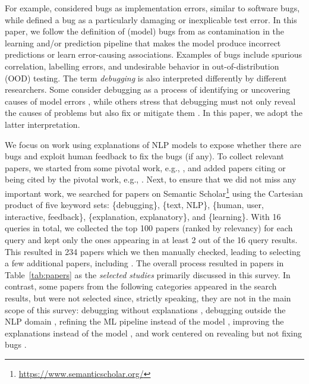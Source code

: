 For example,  considered bugs as implementation errors, similar to software bugs, while
 defined a bug as a particularly damaging or inexplicable test error.
In this paper, we follow the definition of (model) bugs from  as contamination in the learning and/or prediction pipeline that makes the model produce incorrect predictions or learn error-causing associations. Examples of bugs include spurious correlation, labelling errors, and undesirable behavior in out-of-distribution (OOD) testing.
The term \emph{debugging} is also interpreted differently by different researchers. 
Some consider debugging as a process of identifying or uncovering causes of model errors , while others stress that debugging must not only reveal the causes of problems but also fix or mitigate them . In this paper, we adopt the latter interpretation.

We focus on work 
using
explanations of NLP models to expose whether there are bugs
and exploit human feedback to fix the bugs (if any). 
To collect relevant papers, we started from some pivotal \EBHD work, e.g., , and added \EBHD papers citing or being cited by the pivotal work, e.g., .
Next, to ensure that we did not miss any important work, we searched for papers on Semantic Scholar\footnote{\url{https://www.semanticscholar.org/}} using the Cartesian product of five keyword sets: \{debugging\}, \{text, NLP\}, \{human, user, interactive, feedback\}, \{explanation, explanatory\}, and \{learning\}.
With 16 queries in total, we collected the top 100 papers (ranked by relevancy) for each query and kept only the ones appearing in at least 2 out of the 16 query results.
This resulted in 234 papers which we then manually checked, leading to selecting a few additional papers, including . 
The overall process resulted in \numpapers papers in Table~\ref{tab:papers} as the \textit{selected studies} primarily discussed in this survey. 
In contrast, 
some papers from the following categories appeared in the search results, but were not selected
since, strictly speaking, they are not in the main scope of this survey:
debugging without explanations ,
debugging outside the NLP domain , 
refining the ML pipeline instead of the model , 
improving the explanations instead of the model , 
and
work centered on revealing but not fixing bugs .

